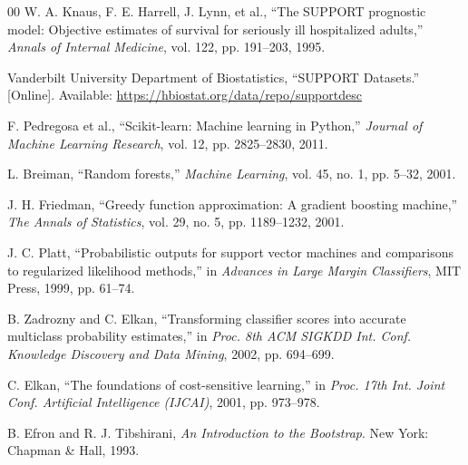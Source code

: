 \documentclass[conference]{IEEEtran}
\begin{document}
\begin{thebibliography}{00}
W. A. Knaus, F. E. Harrell, J. Lynn, et al., ``The SUPPORT prognostic model: Objective estimates of survival for seriously ill hospitalized adults,'' \textit{Annals of Internal Medicine}, vol. 122, pp. 191--203, 1995.

Vanderbilt University Department of Biostatistics, ``SUPPORT Datasets.'' [Online]. Available: \url{https://hbiostat.org/data/repo/supportdesc}

F. Pedregosa et al., ``Scikit-learn: Machine learning in Python,'' \textit{Journal of Machine Learning Research}, vol. 12, pp. 2825--2830, 2011.

L. Breiman, ``Random forests,'' \textit{Machine Learning}, vol. 45, no. 1, pp. 5--32, 2001.

J. H. Friedman, ``Greedy function approximation: A gradient boosting machine,'' \textit{The Annals of Statistics}, vol. 29, no. 5, pp. 1189--1232, 2001.

J. C. Platt, ``Probabilistic outputs for support vector machines and comparisons to regularized likelihood methods,'' in \textit{Advances in Large Margin Classifiers}, MIT Press, 1999, pp. 61--74.

B. Zadrozny and C. Elkan, ``Transforming classifier scores into accurate multiclass probability estimates,'' in \textit{Proc. 8th ACM SIGKDD Int. Conf. Knowledge Discovery and Data Mining}, 2002, pp. 694--699.

C. Elkan, ``The foundations of cost-sensitive learning,'' in \textit{Proc. 17th Int. Joint Conf. Artificial Intelligence (IJCAI)}, 2001, pp. 973--978.

B. Efron and R. J. Tibshirani, \textit{An Introduction to the Bootstrap}. New York: Chapman \& Hall, 1993.
\end{thebibliography}
\end{document}
